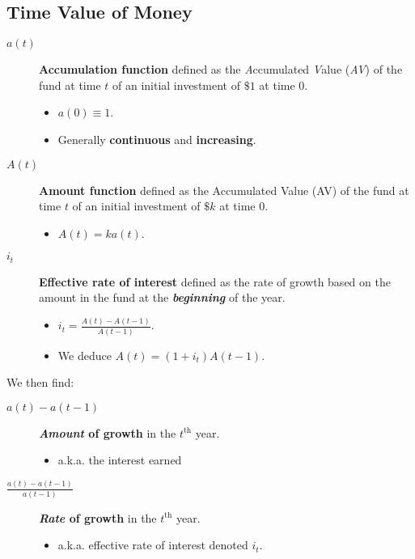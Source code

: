 \documentclass[10pt, french]{article}
\def\SectionColor{cobalt}
\begin{document}
%

\raggedcolumns
\begin{multicols*}{2}

\def\SectionColor{red!80!white}
\section{Time Value of Money}
\begin{distributions}
\begin{description}
	\item[$a(t)$]	\textbf{Accumulation function} defined as the \textit{A}ccumulated \textit{V}alue (\textit{AV}) of the fund at time $t$ of an initial investment of $\$1$ at time 0.
		\begin{itemize}
		\item	$a(0) \equiv 1$.
		\item	Generally \textbf{continuous} and \textbf{increasing}.
		\end{itemize}
	\item[$A(t)$]	\textbf{Amount function} defined as the Accumulated Value (AV) of the fund at time $t$ of an initial investment of $\$k$ at time 0.
		\begin{itemize}[leftmargin = *]
		\item	$A(t) = k a(t)$.
		\end{itemize}
	\item[$i_{t}$]	\textbf{Effective rate of interest} defined as the rate of growth based on the amount in the fund at the \textbf{\textit{beginning}} of the year.
		\begin{itemize}[leftmargin = *]
		\item	$i_{t} = \frac{A(t) - A(t - 1)}{A(t - 1)}$.
		\item	We deduce $A(t) = (1 + i_{t})A(t - 1)$.
		\end{itemize}
\end{description}
\end{distributions}

We then find: 
\begin{description}
	\item[$a(t) - a(t - 1)$]	\textbf{\textit{Amount} of growth} in the $t^{\text{th}}$ year.
		\begin{itemize}[leftmargin = *]
		\item	a.k.a. the interest earned
		\end{itemize}
	\item[$\frac{a(t) - a(t - 1)}{a(t - 1)}$]	\textbf{\textit{Rate} of growth} in the $t^{\text{th}}$ year.
		\begin{itemize}[leftmargin = *]
		\item	a.k.a. effective rate of interest denoted $i_{t}$.
		\end{itemize}
\end{description}


\end{multicols*}
\end{document}
